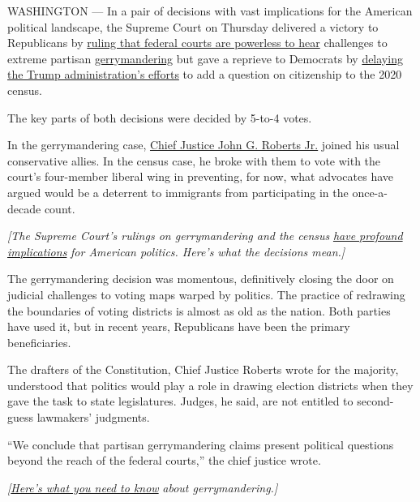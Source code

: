 WASHINGTON --- In a pair of decisions with vast implications for the
American political landscape, the Supreme Court on Thursday delivered a
victory to Republicans by
\href{https://www.supremecourt.gov/opinions/18pdf/18-422_9ol1.pdf}{ruling
that federal courts are powerless to hear} challenges to extreme
partisan
\href{https://www.nytimes.com/2020/07/21/us/politics/trump-immigrants-census-redistricting.html}{gerrymandering}
but gave a reprieve to Democrats by
\href{https://www.supremecourt.gov/opinions/18pdf/18-966_bq7c.pdf}{delaying
the Trump administration's efforts} to add a question on citizenship to
the 2020 census.

The key parts of both decisions were decided by 5-to-4 votes.

In the gerrymandering case,
\href{https://www.nytimes.com/2019/06/27/us/politics/chief-justice-roberts.html}{Chief
Justice John G. Roberts Jr.} joined his usual conservative allies. In
the census case, he broke with them to vote with the court's four-member
liberal wing in preventing, for now, what advocates have argued would be
a deterrent to immigrants from participating in the once-a-decade count.

\emph{{[}The Supreme Court's rulings on gerrymandering and the census}
\href{https://www.nytimes.com/2019/06/27/us/supreme-court-gerrymandering-census.html}{\emph{have
profound implications}} \emph{for American politics. Here's what the
decisions mean.{]}}

The gerrymandering decision was momentous, definitively closing the door
on judicial challenges to voting maps warped by politics. The practice
of redrawing the boundaries of voting districts is almost as old as the
nation. Both parties have used it, but in recent years, Republicans have
been the primary beneficiaries.

The drafters of the Constitution, Chief Justice Roberts wrote for the
majority, understood that politics would play a role in drawing election
districts when they gave the task to state legislatures. Judges, he
said, are not entitled to second-guess lawmakers' judgments.

``We conclude that partisan gerrymandering claims present political
questions beyond the reach of the federal courts,'' the chief justice
wrote.

\emph{{[}}\href{https://www.nytimes.com/2019/06/27/us/gerrymander-explainer.html?action=click\&module=Intentional\&pgtype=Article}{\emph{Here's
what you need to know}} \emph{about gerrymandering.{]}}

